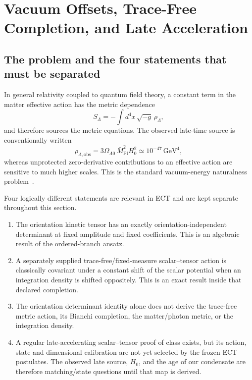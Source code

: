 
\section{Vacuum Offsets, Trace-Free Completion, and Late Acceleration}
\label{sec:cc_problem}

\subsection{The problem and the four statements that must be separated}
\label{subsec:cc_statement}

In general relativity coupled to quantum field theory, a constant term in
the matter effective action has the metric dependence
\begin{equation}
 S_\Lambda=-\int d^4x\,\sqrt{-g}\,\rho_\Lambda ,
 \label{eq:cc_standard}
\end{equation}
and therefore sources the metric equations.  The observed late-time source
is conventionally written
\begin{equation}
 \rho_{\Lambda,\mathrm{obs}}
 =3\Omega_{\Lambda0}\,\bar M_{\mathrm{Pl}}^2H_0^2
 \simeq 10^{-47}\,\mathrm{GeV}^4,
 \label{eq:rho_obs}
\end{equation}
whereas unprotected zero-derivative contributions to an effective action are
sensitive to much higher scales.  This is the standard vacuum-energy
naturalness problem~\cite{Weinberg1989,Carroll2001,Polchinski2006}.

Four logically different statements are relevant in ECT and are kept
separate throughout this section.
\begin{enumerate}
\item The orientation kinetic tensor has an exactly orientation-independent
determinant at fixed amplitude and fixed coefficients.  This is an algebraic
result of the ordered-branch ansatz.
\item A separately supplied trace-free/fixed-measure scalar--tensor action is
classically covariant under a constant shift of the scalar potential when an
integration density is shifted oppositely.  This is an exact result inside
that declared completion.
\item The orientation determinant identity alone does not derive the
trace-free metric action, its Bianchi completion, the matter/photon metric,
or the integration density.
\item A regular late-accelerating scalar--tensor proof of class exists, but
its action, state and dimensional calibration are not yet selected by the
frozen ECT postulates.  The observed late source, $H_0$, and the age of our
condensate are therefore matching/state questions until that map is derived.
\end{enumerate}

